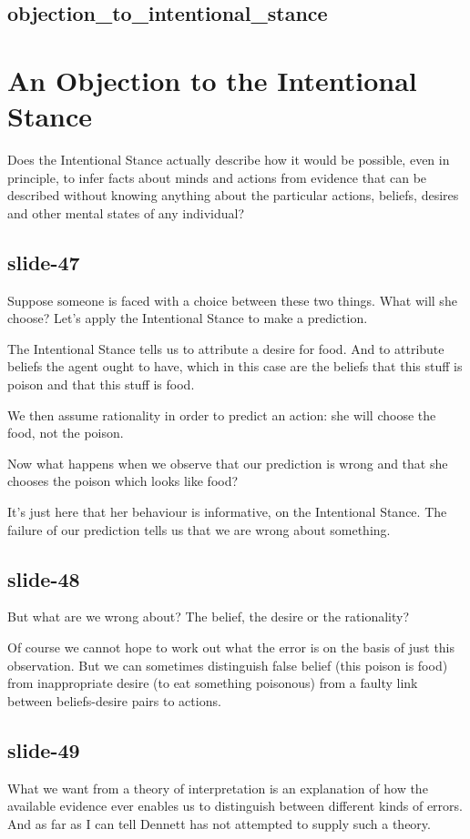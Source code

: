 \documentclass[12pt,\papersize]{extarticle}
\begin{document}
\subsection{objection\_to\_intentional\_stance}


\section{An Objection to the Intentional Stance}

Does the Intentional Stance actually describe how it would be possible,
even in principle, to infer facts about minds and actions from
evidence that can
be described without knowing anything about the particular actions, beliefs, desires and
other mental states of any individual?

\subsection{slide-47}
Suppose someone is faced with a choice between these two things.
What will she choose?
Let’s apply the Intentional Stance to make a prediction.

The Intentional Stance tells us to attribute a desire for food.
And to attribute beliefs the agent ought to have, which in this case
are the beliefs that this stuff is poison and that this stuff is food.

We then assume rationality in order to predict an action:
she will choose the food, not the poison.

Now what happens when we observe that our prediction is wrong
and that she chooses the poison which looks like food?

It’s just here that her behaviour is informative, on the Intentional
Stance.
The failure of our prediction tells us that we are wrong about something.

\subsection{slide-48}
But what are we wrong about?  The belief, the desire or the rationality?

Of course we cannot hope to work out what the error is on the basis
of just this observation.
But we can sometimes distinguish false belief (this poison is food)
from inappropriate desire (to eat something poisonous) from
a faulty link between beliefs-desire pairs to actions.

\subsection{slide-49}
What we want from a theory of interpretation is an explanation of
how the available evidence ever enables us to distinguish between
different kinds of errors.
And as far as I can tell Dennett has not attempted to supply such a
theory.
\end{document}

